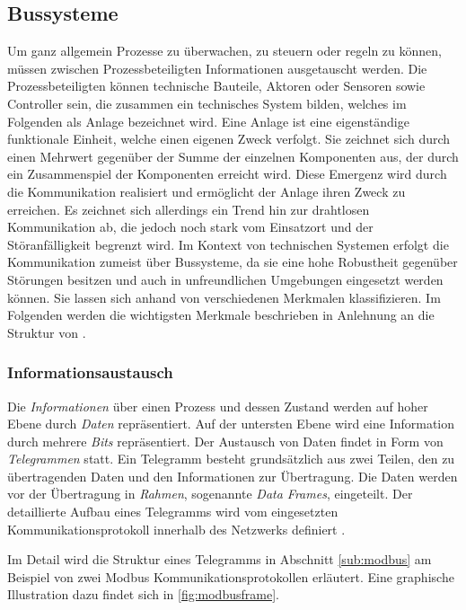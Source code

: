 \subsection{Bussysteme}

Um ganz allgemein Prozesse zu überwachen, zu steuern oder regeln zu können, müssen zwischen Prozessbeteiligten Informationen ausgetauscht werden. 
Die Prozessbeteiligten können technische Bauteile, Aktoren oder Sensoren sowie Controller sein, die zusammen ein technisches System bilden, welches im Folgenden als Anlage bezeichnet wird. Eine Anlage ist eine eigenständige funktionale Einheit, welche einen eigenen Zweck verfolgt. Sie zeichnet sich durch einen Mehrwert gegenüber der Summe der einzelnen Komponenten aus, der durch ein Zusammenspiel der Komponenten erreicht wird. Diese Emergenz wird durch die Kommunikation realisiert und ermöglicht der Anlage ihren Zweck zu erreichen.
Es zeichnet sich allerdings ein Trend hin zur drahtlosen Kommunikation ab, die jedoch noch stark vom Einsatzort und der Störanfälligkeit begrenzt wird. Im Kontext von technischen Systemen erfolgt die Kommunikation zumeist über Bussysteme, da sie eine hohe Robustheit gegenüber Störungen besitzen und auch in unfreundlichen Umgebungen eingesetzt werden können. Sie lassen sich anhand von verschiedenen Merkmalen klassifizieren. Im Folgenden werden die wichtigsten Merkmale beschrieben in Anlehnung an die Struktur von \cite{schn06}.


\subsubsection{Informationsaustausch}

Die \textit{Informationen} über einen Prozess und dessen Zustand werden auf hoher Ebene durch \textit{Daten} repräsentiert. Auf der untersten Ebene wird eine Information durch mehrere \textit{Bits} repräsentiert. Der Austausch von Daten findet in Form von \textit{Telegrammen} statt. Ein Telegramm besteht grundsätzlich aus zwei Teilen, den zu übertragenden Daten und den Informationen zur Übertragung. Die Daten werden vor der Übertragung in \textit{Rahmen}, sogenannte \textit{Data Frames}, eingeteilt. Der detaillierte Aufbau eines Telegramms wird vom eingesetzten Kommunikationsprotokoll innerhalb des Netzwerks definiert \cite[S.~11f.]{schn06}.

Im Detail wird die Struktur eines Telegramms in Abschnitt \ref{sub:modbus} am Beispiel von zwei Modbus Kommunikationsprotokollen erläutert. Eine graphische Illustration dazu findet sich in \ref{fig:modbusframe}.

